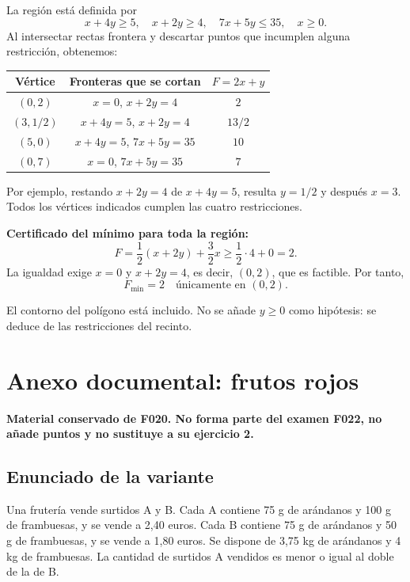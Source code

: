 \documentclass[11pt]{article}
\begin{document}
La región está definida por
\[x+4y\geq5,\quad x+2y\geq4,\quad7x+5y\leq35,\quad x\geq0.\]
Al intersectar rectas frontera y descartar puntos que incumplen alguna restricción, obtenemos:
\begin{center}
\begin{tabular}{c|c|c}
Vértice & Fronteras que se cortan & $F=2x+y$\\\hline
$(0,2)$ & $x=0$, $x+2y=4$ & $2$\\
$(3,1/2)$ & $x+4y=5$, $x+2y=4$ & $13/2$\\
$(5,0)$ & $x+4y=5$, $7x+5y=35$ & $10$\\
$(0,7)$ & $x=0$, $7x+5y=35$ & $7$
\end{tabular}
\end{center}
Por ejemplo, restando $x+2y=4$ de $x+4y=5$, resulta $y=1/2$ y después $x=3$. Todos los vértices indicados cumplen las cuatro restricciones.

\textbf{Certificado del mínimo para toda la región:}
\[F=\frac12(x+2y)+\frac32x\geq\frac12\cdot4+0=2.\]
La igualdad exige $x=0$ y $x+2y=4$, es decir, $(0,2)$, que es factible. Por tanto,
\[\boxed{F_{\min}=2\quad\text{únicamente en }(0,2)}.\]
\begin{center}
\end{center}
El contorno del polígono está incluido. No se añade $y\geq0$ como hipótesis: se deduce de las restricciones del recinto.
\clearpage
\section*{Anexo documental: frutos rojos}
\textbf{Material conservado de F020. No forma parte del examen F022, no añade puntos y no sustituye a su ejercicio 2.}
\subsection*{Enunciado de la variante}
Una frutería vende surtidos A y B. Cada A contiene 75 g de arándanos y 100 g de frambuesas, y se vende a 2,40 euros. Cada B contiene 75 g de arándanos y 50 g de frambuesas, y se vende a 1,80 euros. Se dispone de 3,75 kg de arándanos y 4 kg de frambuesas. La cantidad de surtidos A vendidos es menor o igual al doble de la de B.
\end{document}
